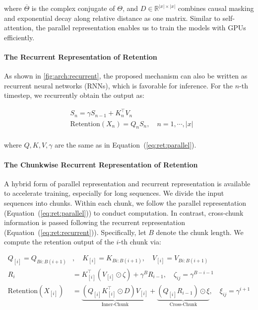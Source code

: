 where $\overline{\Theta}$ is the complex conjugate of $\Theta$, and $D \in \mathbb{R}^{|x|\times |x|}$ combines causal masking and exponential decay along relative distance as one matrix. Similar to self-attention, the parallel representation enables us to train the models with GPUs efficiently.

\paragraph{The Recurrent Representation of Retention} As shown in \ref{fig:arch:recurrent}, the proposed mechanism can also be written as recurrent neural networks (RNNs), which is favorable for inference. For the $n$-th timestep, we recurrently obtain the output as:

\begin{equation}
\begin{aligned}
\label{eq:ret:recurrent}
&S_n = \gamma S_{n-1} + K_n^{\intercal} V_n \\
&\mathrm{Rete}\mathrm{ntion} (X_n) = Q_n S_n, \quad n = 1, \cdots, |x| \\
\end{aligned}
\end{equation}

where $Q,K,V,\gamma$ are the same as in Equation~(\ref{eq:ret:parallel}).

\paragraph{The Chunkwise Recurrent Representation of Retention} A hybrid form of parallel representation and recurrent representation is available to accelerate training, especially for long sequences. We divide the input sequences into chunks. Within each chunk, we follow the parallel representation (Equation~(\ref{eq:ret:parallel})) to conduct computation. In contrast, cross-chunk information is passed following the recurrent representation (Equation~(\ref{eq:ret:recurrent})).
Specifically, let $B$ denote the chunk length. We compute the retention output of the $i$-th chunk via:

\begin{equation}
\begin{aligned}
\label{eq:ret:chunk}
Q_{[i]} = Q_{Bi:B(i+1)} &,\quad K_{[i]} = K_{Bi:B(i+1)},\quad V_{[i]} = V_{Bi:B(i+1)} \\
R_{i}&=K_{[i]}^\intercal (V_{[i]}\odot \zeta)+\gamma^{B}R_{i-1}, \quad\zeta_{ij}=\gamma^{B-i-1}\\
\mathrm{Rete}\mathrm{ntion} (X_{[i]}) &= \underbrace{ (Q_{[i]} K^\intercal_{[i]}\odot D) V_{[i]} }_{\text{Inner-Chunk}} + \underbrace{ (Q_{[i]}R_{i-1}) \odot \xi}_{\text{Cross-Chunk}}, \quad\xi_{ij}=\gamma^{i+1}
\end{aligned}
\end{equation}

